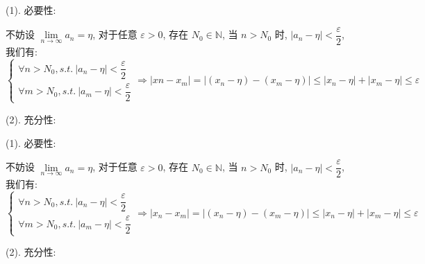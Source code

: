 \begin{anymark}[证明]
	(1). 必要性:

	不妨设 $\lim\limits_{n\to \infty} a_{n} =\eta$, 对于任意 $\varepsilon > 0$, 存在 $N_{0}\in\mathbb{N}$, 当 $n>N_{0}$ 时, $|a_{n}-\eta|<\dfrac{\varepsilon}{2}$, 我们有:
	$$\begin{cases} 
		\forall n > N_{0}, s.t.\ |a_{n} - \eta| < \dfrac{\varepsilon}{2}\\ 
		\forall m > N_{0}, s.t.\ |a_{m} - \eta| < \dfrac{\varepsilon}{2}
	\end{cases}
	\Rightarrow 
	|x{n}-x_{m}| = |(x_{n} - \eta) - (x_{m} - \eta)| \leq |x_{n} - \eta| + |x_{m}-\eta| \leq \varepsilon$$

	(2). 充分性:


\end{anymark}

\begin{proposition}
	
\end{proposition}

\begin{anymark}[证明]
	(1). 必要性:

	不妨设 $\lim\limits_{n\to \infty} a_{n} =\eta$, 对于任意 $\varepsilon > 0$, 存在 $N_{0}\in\mathbb{N}$, 当 $n>N_{0}$ 时, $|a_{n}-\eta|<\dfrac{\varepsilon}{2}$, 我们有:
	$$\begin{cases} 
		\forall n > N_{0}, s.t.\ |a_{n} - \eta| < \dfrac{\varepsilon}{2}\\ 
		\forall m > N_{0}, s.t.\ |a_{m} - \eta| < \dfrac{\varepsilon}{2}
	\end{cases}
	\Rightarrow 
	|x_{n}-x_{m}| = |(x_{n} - \eta) - (x_{m} - \eta)| \leq |x_{n} - \eta| + |x_{m}-\eta| \leq \varepsilon$$

	(2). 充分性:


\end{anymark}

\begin{proposition}[柯西收敛准则:函数]
	
\end{proposition}
